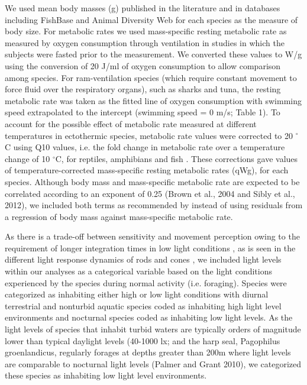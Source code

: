 We used mean body masses (g) published in the literature and in databases including FishBase \citep{froese2012fishbase} and Animal Diversity Web \citep{myers2006animal} for each species as the measure of body size. For metabolic rates we used mass-specific resting metabolic rate as measured by oxygen consumption through ventilation in studies in which the subjects were fasted prior to the measurement. We converted these values to W/g using the conversion of 20 J/ml of oxygen consumption \citep{makarieva2008mean} to allow comparison among species. For ram-ventilation species (which require constant movement to force fluid over the respiratory organs), such as sharks and tuna, the resting metabolic rate was taken as the fitted line of oxygen consumption with swimming speed extrapolated to the intercept (swimming speed = 0 m/s; Table 1). To account for the possible effect of metabolic rate measured at different temperatures in ectothermic species, metabolic rate values were corrected to 20 $^{\circ}$C using Q10 values, i.e. the fold change in metabolic rate over a temperature change of 10 $^{\circ}$C, for reptiles, amphibians and fish \citep{white2006scaling}. These corrections gave values of temperature-corrected mass-specific resting metabolic rates (qWg), for each species. Although body mass and mass-specific metabolic rate are expected to be correlated according to an exponent of 0.25 \citep{brown2004, sibly2012metabolic} (Brown et al., 2004 and Sibly et al., 2012), we included both terms as recommended by \citep{freckleton2009seven} instead of using residuals from a regression of body mass against mass-specific metabolic rate.

As there is a trade-off between sensitivity and movement perception owing to the requirement of longer integration times in low light conditions \citep{tansley1965vision}, as is seen in the different light response dynamics of rods and cones \citep{rubene2010presence}, we included light levels within our analyses as a categorical variable based on the light conditions experienced by the species during normal activity (i.e. foraging). Species were categorized as inhabiting either high or low light conditions with diurnal terrestrial and nonturbid aquatic species coded as inhabiting high light level environments and nocturnal species coded as inhabiting low light levels. As the light levels of species that inhabit turbid waters are typically orders of magnitude lower than typical daylight levels (40-1000 lx; \citealt{ali1985vision,palmer2010art,kreysing2012photonic} and the harp seal, Pagophilus groenlandicus, regularly forages at depths greater than 200m \citep{folkow2004distribution} where light levels are comparable to nocturnal light levels (Palmer and Grant 2010), we categorized these species as inhabiting low light level environments.


